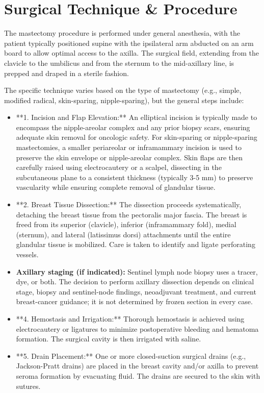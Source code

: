 \section*{Surgical Technique \& Procedure}
The mastectomy procedure is performed under general anesthesia, with the patient typically positioned supine with the ipsilateral arm abducted on an arm board to allow optimal access to the axilla. The surgical field, extending from the clavicle to the umbilicus and from the sternum to the mid-axillary line, is prepped and draped in a sterile fashion.

The specific technique varies based on the type of mastectomy (e.g., simple, modified radical, skin-sparing, nipple-sparing), but the general steps include:

\begin{itemize}
  \item **1. Incision and Flap Elevation:** An elliptical incision is typically made to encompass the nipple-areolar complex and any prior biopsy scars, ensuring adequate skin removal for oncologic safety. For skin-sparing or nipple-sparing mastectomies, a smaller periareolar or inframammary incision is used to preserve the skin envelope or nipple-areolar complex. Skin flaps are then carefully raised using electrocautery or a scalpel, dissecting in the subcutaneous plane to a consistent thickness (typically 3-5 mm) to preserve vascularity while ensuring complete removal of glandular tissue.
  \item **2. Breast Tissue Dissection:** The dissection proceeds systematically, detaching the breast tissue from the pectoralis major fascia. The breast is freed from its superior (clavicle), inferior (inframammary fold), medial (sternum), and lateral (latissimus dorsi) attachments until the entire glandular tissue is mobilized. Care is taken to identify and ligate perforating vessels.
  \item \textbf{Axillary staging (if indicated):} Sentinel lymph node biopsy uses a tracer, dye, or both. The decision to perform axillary dissection depends on clinical stage, biopsy and sentinel-node findings, neoadjuvant treatment, and current breast-cancer guidance; it is not determined by frozen section in every case.
  \item **4. Hemostasis and Irrigation:** Thorough hemostasis is achieved using electrocautery or ligatures to minimize postoperative bleeding and hematoma formation. The surgical cavity is then irrigated with saline.
  \item **5. Drain Placement:** One or more closed-suction surgical drains (e.g., Jackson-Pratt drains) are placed in the breast cavity and/or axilla to prevent seroma formation by evacuating fluid. The drains are secured to the skin with sutures.

\end{itemize}
